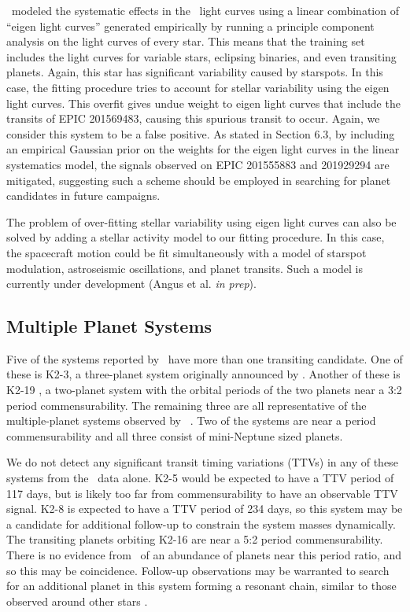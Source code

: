 \paperit\ modeled the systematic effects in the \KT\ light curves using a
linear combination of ``eigen light curves'' generated empirically by running
a principle component analysis on the light curves of every star.
This means that the training set includes the light curves for variable stars,
eclipsing binaries, and even transiting planets.
Again, this star has significant variability caused by starspots.
In this case, the fitting procedure tries to account for stellar variability using
the eigen light curves.
This overfit gives undue weight to eigen light curves that include the transits
of EPIC 201569483, causing this spurious transit to occur.
Again, we consider this system to be a false positive.
As stated in Section 6.3, by including an empirical Gaussian
prior on the weights for the eigen light curves in the linear systematics model,
the signals observed on EPIC 201555883 and 201929294 are mitigated, suggesting
such a scheme should be employed in searching for planet candidates in future
campaigns.

The problem of over-fitting stellar variability using eigen light curves can also be
solved by adding a stellar activity model to our fitting procedure.
In this case, the spacecraft motion could be fit simultaneously with a model
of starspot modulation, astroseismic oscillations, and planet transits.
Such a model is currently under development (Angus et al. \textit{in prep}).


\subsection{Multiple Planet Systems}
Five of the systems reported by \paperit\ have more than one transiting
candidate.
One of these is K2-3, a three-planet system originally announced by
\citet{Crossfield15}.
Another of these is K2-19 \citep{Armstrong15b}, a two-planet system with the
orbital periods of the two planets near a 3:2 period commensurability.
The remaining three are all representative of the multiple-planet systems observed by
\kep\ \citep{Lissauer11b, Fabrycky14}.
Two of the systems are near a period commensurability and all three consist of
mini-Neptune sized planets.



We do not detect any significant transit timing variations (TTVs) in any of these systems from
the \KT\ data alone.
K2-5 would be expected to have a TTV period of 117 days, but
is likely too far from commensurability to have an observable TTV signal.
K2-8 is expected to have a TTV period of 234 days, so this system may be a candidate
for additional follow-up to constrain the system masses dynamically.
The transiting planets orbiting K2-16 are near a 5:2 period commensurability.
There is no evidence from \kep\ of an abundance of planets near this period ratio, and so this
may be coincidence.
Follow-up observations may be warranted to search for an additional planet in this system
forming a resonant chain, similar to those observed around other stars \citep[e.g.][]{Swift13,
Campante15}.

